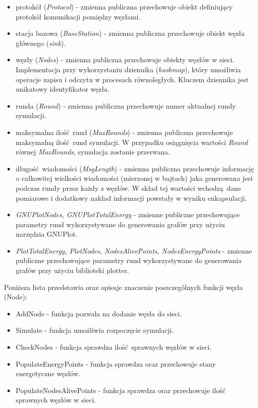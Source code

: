 \documentclass[a4paper,12pt,twoside,openany]{report}
\begin{document}
\begin{itemize}
 \item protokół (\textit{Protocol}) - zmienna publiczna przechowuje obiekt definiujący protokół komunikacji pomiędzy węzłami.
 \item stacja bazowa (\textit{BaseStation}) - zmienna publiczna przechowuje obiekt węzła głównego (\textit{sink}).
 \item węzły (\textit{Nodes}) - zmienna publiczna przechowuje obiekty węzłów w sieci. Implementacja przy wykorzystaniu dziennika (\textit{hashmap}), 
       który umożliwia operacje zapisu i odczytu w procesach równoległych. Kluczem dziennika jest unikatowy identyfikator węzła.
 \item runda (\textit{Round}) - zmienna publiczna przechowuje numer aktualnej rundy symulacji.
 \item maksymalna ilość rund (\textit{MaxRounds}) - zmienna publiczna przechowuje maksymalną ilość rund symulacji. 
       W przypadku osiągnięcia wartości \textit{Round} równej \textit{MaxRounds}, symulacja zostanie przerwana.
 \item długość wiadomości (\textit{MsgLength}) - zmienna publiczna przechowuje informację o całkowitej wielkości wiadomości (mierzonej w bajtach) jaka generowana
       jest podczas rundy przez każdy z węzłów. W skład tej wartości wchodzą dane pomiarowe i dodatkowy nakład informacji powstały w wyniku enkapsulacji.
 \item \textit{GNUPlotNodes, GNUPlotTotalEnergy} - zmienne publiczne przechowujące parametry rund wykorzystywane do generowania grafów przy użyciu narzędzia GNUPlot.
 \item \textit{PlotTotalEnergy, PlotNodes, NodesAlivePoints, NodesEnergyPoints} - zmienne publiczne przechowujące parametry rund wykorzystywane do generowania grafów
       przy użyciu biblioteki plotter.
\end{itemize}

Poniższa lista przedstawia oraz opisuje znaczenie poszczególnych funkcji węzła (Node):

\begin{itemize}
 \item AddNode - funkcja pozwala na dodanie węzła do sieci.
 \item Simulate - funkcja umożliwia rozpoczęcie symulacji.
 \item CheckNodes - funkcja sprawdza ilość sprawnych węzłów w sieci.
 \item PopulateEnergyPoints - funkcja sprawdza oraz przechowuje stany energetyczne węzłów.
 \item PopulateNodesAlivePoints - funkcja sprawdza oraz przechowuje ilość sprawnych węzłów w sieci.
\end{itemize}
\end{document}
